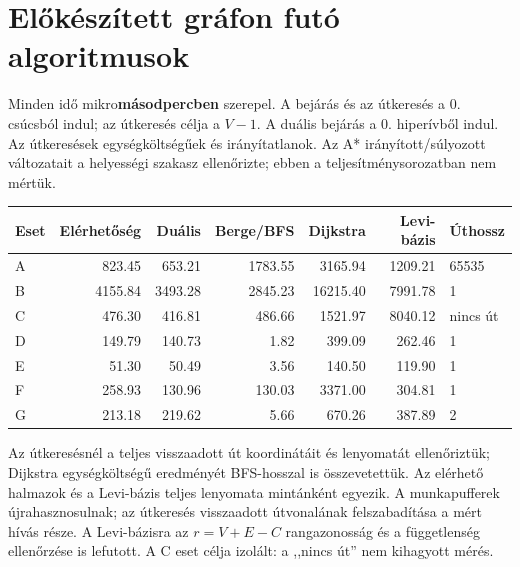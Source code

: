 \documentclass[10pt,a4paper]{article}
\begin{document}
\begin{center}\end{center}

\newpage\section*{Előkészített gráfon futó algoritmusok}
Minden idő mikro\textbf{másodpercben} szerepel. A bejárás és az útkeresés a
0. csúcsból indul; az útkeresés célja a $V-1$. A duális bejárás a 0. hiperívből
indul. Az útkeresések egységköltségűek és irányítatlanok. Az A* irányított/súlyozott
változatait a helyességi szakasz ellenőrizte; ebben a teljesítménysorozatban nem mértük.
\begin{center}\begin{tabular}{lrrrrrl}\toprule
Eset & Elérhetőség & Duális & Berge/BFS & Dijkstra & Levi-bázis & Úthossz\\\midrule
A & 823.45 & 653.21 & 1783.55 & 3165.94 & 1209.21 & 65535 \\
B & 4155.84 & 3493.28 & 2845.23 & 16215.40 & 7991.78 & 1 \\
C & 476.30 & 416.81 & 486.66 & 1521.97 & 8040.12 & nincs út \\
D & 149.79 & 140.73 & 1.82 & 399.09 & 262.46 & 1 \\
E & 51.30 & 50.49 & 3.56 & 140.50 & 119.90 & 1 \\
F & 258.93 & 130.96 & 130.03 & 3371.00 & 304.81 & 1 \\
G & 213.18 & 219.62 & 5.66 & 670.26 & 387.89 & 2 \\
\bottomrule\end{tabular}\end{center}
Az útkeresésnél a teljes visszaadott út koordinátáit és lenyomatát ellenőriztük;
Dijkstra egységköltségű eredményét BFS-hosszal is összevetettük. Az elérhető halmazok
és a Levi-bázis teljes lenyomata mintánként egyezik. A munkapufferek újrahasznosulnak;
az útkeresés visszaadott útvonalának felszabadítása a mért hívás része.
A Levi-bázisra az $r=V+E-C$ rangazonosság és a függetlenség ellenőrzése is lefutott.
A C eset célja izolált: a ,,nincs út'' nem kihagyott mérés.
\end{document}
